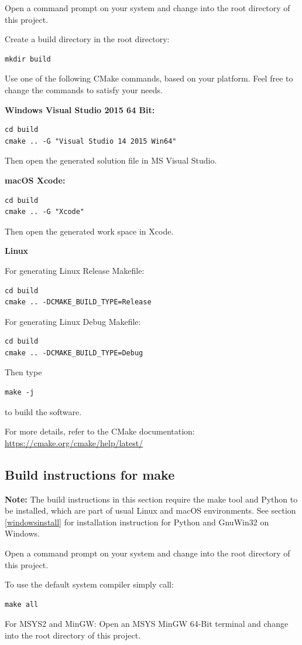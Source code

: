 \documentclass[a4paper,11pt]{jvetdoc}
\begin{document}
Open a command prompt on your system and change into the root directory
of this project.

Create a build directory in the root directory:
\begin{verbatim}
mkdir build 
\end{verbatim}
Use one of the following CMake commands, based on your platform. Feel free to change the 
commands to satisfy your needs.

\textbf{Windows Visual Studio 2015 64 Bit:}
\begin{verbatim}
cd build
cmake .. -G "Visual Studio 14 2015 Win64"
\end{verbatim}
Then open the generated solution file in MS Visual Studio.

\textbf{macOS Xcode:}
\begin{verbatim}
cd build
cmake .. -G "Xcode"
\end{verbatim}
Then open the generated work space in Xcode.

\textbf{Linux}

For generating Linux Release Makefile:
\begin{verbatim}
cd build
cmake .. -DCMAKE_BUILD_TYPE=Release
\end{verbatim}
For generating Linux Debug Makefile:
\begin{verbatim}
cd build
cmake .. -DCMAKE_BUILD_TYPE=Debug
\end{verbatim}
Then type
\begin{verbatim}
make -j
\end{verbatim}
to build the software.

For more details, refer to the CMake documentation: \url{https://cmake.org/cmake/help/latest/}

\subsection {Build instructions for make}

\textbf{Note:}
The build instructions in this section require the make tool and Python
to be installed, which are part of usual Linux and macOS environments. 
See section \ref{windowsinstall} for installation instruction for Python 
and GnuWin32 on Windows.

Open a command prompt on your system and change into the root directory
of this project.

To use the default system compiler simply call:
\begin{verbatim}
make all
\end{verbatim}
For MSYS2 and MinGW:
Open an MSYS MinGW 64-Bit terminal and change into the root directory
of this project.
\end{document}
